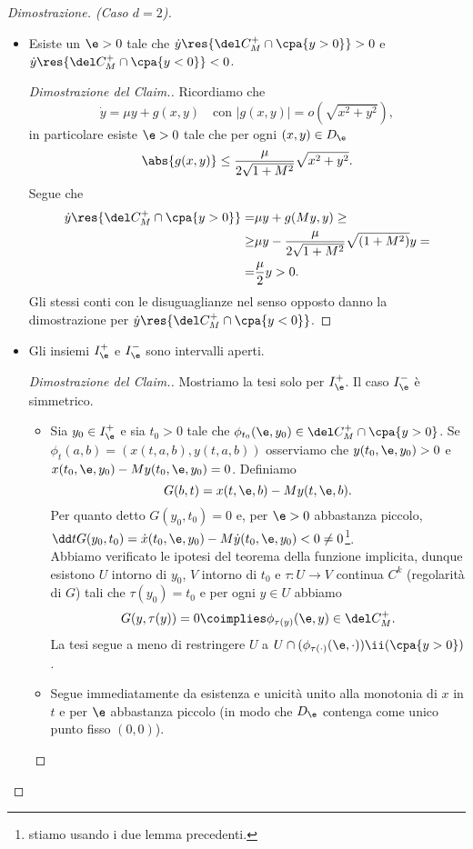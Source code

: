 \begin{proof}[Dimostrazione. (Caso $d=2$)]
\begin{itemize}
\begin{proof}[Dimostrazione del Claim.]
\begin{align*}
\pasgnlmath\leq{x>0} & -\la x+\frac\la2x=-\frac\la2 x<0.
\end{align*}
\end{proof}
\item[\ul{Claim}:] Esiste un $\e>0$ tale che $\dot y\res{\del C_M^+\cap \cpa{y>0}}>0$ e $\dot y\res{\del C_M^+\cap \cpa{y<0}}<0$.
\begin{proof}[Dimostrazione del Claim.]
Ricordiamo che
\[\dot y=\mu y+g(x,y)\quad\text{con }|g(x,y)|=o(\sqrt{x^2+y^2}),\]
in particolare esiste $\e>0$ tale che per ogni $(x,y)\in D_\e$
\[\abs{g(x,y)}\leq \frac\mu{2\sqrt{1+M^2}}\sqrt{x^2+y^2}.\]
Segue che
\begin{align*}
\dot y\res{\del C_M^+\cap \cpa{y>0}}=&\mu y+g(My,y)\geq\\
\geq&\mu y-\frac\mu{2\sqrt{1+M^2}}\sqrt{(1+M^2)}y=\\
=&\frac\mu2y>0.
\end{align*}
Gli stessi conti con le disuguaglianze nel senso opposto danno la dimostrazione per $\dot y\res{\del C_M^+\cap \cpa{y<0}}$.
\end{proof}
\item[\ul{Claim}:] Gli insiemi $I_\e^+$ e $I_\e^-$ sono intervalli aperti.
\begin{proof}[Dimostrazione del Claim.]
Mostriamo la tesi solo per $I_\e^+$. Il caso $I_\e^-$ \`e simmetrico.
\setlength{\leftmargini}{0cm}
\begin{itemize}
\item[$\boxed{\text{aperto}}$] Sia $y_0\in I_\e^+$ e sia $t_0>0$ tale che $\phi_{t_0}(\e,y_0)\in \del C_M^+\cap\cpa{y>0}$. Se $\phi_t(a,b)=(x(t,a,b),y(t,a,b))$ osserviamo che $y(t_0,\e,y_0)>0$ e $x(t_0,\e,y_0)-My(t_0,\e,y_0)=0$. Definiamo
\[G(b,t)=x(t,\e,b)-My(t,\e,b).\]
Per quanto detto $G(y_0,t_0)=0$ e, per $\e>0$ abbastanza piccolo, $\dd t{}G(y_0,t_0)=\dot x(t_0,\e,y_0)-M\dot y(t_0,\e,y_0)<0\neq 0$\footnote{stiamo usando i due lemma precedenti.}.\\
Abbiamo verificato le ipotesi del teorema della funzione implicita, dunque esistono $U$ intorno di $y_0$, $V$ intorno di $t_0$ e $\tau:U\to V$ continua $C^k$ (regolarit\`a di $G$) tali che $\tau(y_0)=t_0$ e per ogni $y\in U$ abbiamo
\[G(y,\tau(y))=0\coimplies \phi_{\tau(y)}(\e,y)\in \del C_M^+.\]
La tesi segue a meno di restringere $U$ a $U\cap (\phi_{\tau(\cdot)}(\e,\cdot))\ii(\cpa{y>0})$.
\item[$\boxed{\text{connesso}}$] Segue immediatamente da esistenza e unicit\`a unito alla monotonia di $x$ in $t$ e per $\e$ abbastanza piccolo (in modo che $D_\e$ contenga come unico punto fisso $(0,0)$). 

\end{itemize}
\end{proof}
\end{itemize}
\end{proof}
